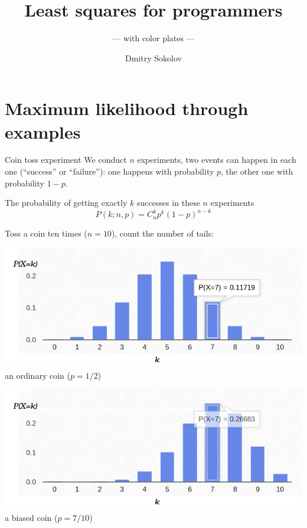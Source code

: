 \documentclass[UKenglish,aspectratio=169]{beamer}
\author{Dmitry Sokolov}
\title{Least squares for programmers}
\subtitle{--- with color plates ---}
\begin{document}

\section{Maximum likelihood through examples}
\begin{frame}{Coin toss experiment}
We conduct $n$ experiments, two events can happen in each one (``success'' or ``failure''):
one happens with probability $p$, the other one with probability $1-p$.

\pause
\begin{block}{The probability of getting exactly $k$ successes in these $n$ experiments}
$$
P(k;n,p) = C_n^k p^k (1-p)^{n-k}
$$
\end{block}

\pause
Toss a coin ten times ($n=10$), count the number of tails:
\begin{minipage}{.45\linewidth}
\centering
\includegraphics[width=\columnwidth]{../manuscript/img/binomial-05.png}
an ordinary coin ($p=1/2$)
\end{minipage}
\pause
\begin{minipage}{.45\linewidth}
\centering
\includegraphics[width=\columnwidth]{../manuscript/img/binomial-07.png}
a biased coin ($p=7/10$)
\end{minipage}
\end{frame}
\end{document}
